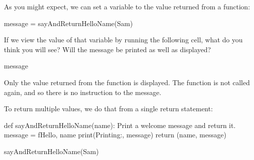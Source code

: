 \documentclass[letterpaper,10pt,english]{sphinxmanual}
\begin{document}
As you might expect, we can set a variable to the value returned from a function:

{
\begin{sphinxVerbatim}[commandchars=\\\{\}]
\llap{\color{nbsphinxin}[ ]:\,\hspace{\fboxrule}\hspace{\fboxsep}}message = sayAndReturnHelloName(\PYGZsq{}Sam\PYGZsq{})
\end{sphinxVerbatim}
}

If we view the value of that variable by running the following cell, what do you think you will see? Will the message be printed as well as displayed?


{
\begin{sphinxVerbatim}[commandchars=\\\{\}]
\llap{\color{nbsphinxin}[ ]:\,\hspace{\fboxrule}\hspace{\fboxsep}}message
\end{sphinxVerbatim}
}

Only the value returned from the function is displayed. The function is not called again, and so there is no instruction to  the message.

To return multiple values, we do that from a single return statement:

{
\begin{sphinxVerbatim}[commandchars=\\\{\}]
\llap{\color{nbsphinxin}[ ]:\,\hspace{\fboxrule}\hspace{\fboxsep}}def sayAndReturnHelloName(name):
    \PYGZdq{}\PYGZdq{}\PYGZdq{}Print a welcome message and return it.\PYGZdq{}\PYGZdq{}\PYGZdq{}
    message = f\PYGZdq{}Hello, \PYGZob{}name\PYGZcb{}\PYGZdq{}
    print(\PYGZdq{}Printing:\PYGZdq{}, message)
    return (name, message)

sayAndReturnHelloName(\PYGZsq{}Sam\PYGZsq{})
\end{sphinxVerbatim}
}
\end{document}
